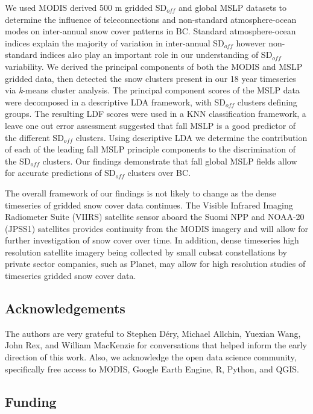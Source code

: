 \documentclass{tATO2e}
\newcommand{\sdoff}{SD$_{off}$}
\begin{document}
We used MODIS derived 500 m gridded \sdoff{} and global MSLP datasets to determine the influence of teleconnections and non-standard atmosphere-ocean modes on inter-annual snow cover patterns in BC. Standard atmosphere-ocean indices explain the majority of variation in inter-annual \sdoff{} however non-standard indices also play an important role in our understanding of \sdoff{} variability. We derived the principal components of both the MODIS and MSLP gridded data, then detected the snow clusters present in our 18 year timeseries via \textit{k}-means cluster analysis. The principal component scores of the MSLP data were decomposed in a descriptive LDA framework, with \sdoff{} clusters defining groups. The resulting LDF scores were used in a  KNN classification framework, a leave one out error assessment suggested that fall MSLP is a good predictor of the different \sdoff{} clusters. Using descriptive LDA we determine the contribution of each of the leading fall MSLP principle components to the discrimination of the \sdoff{} clusters. Our findings demonstrate that fall global MSLP fields allow for accurate predictions of \sdoff{} clusters over BC.
\par
The overall framework of our findings is not likely to change as the dense timeseries of gridded snow cover data continues. The Visible Infrared Imaging Radiometer Suite (VIIRS) satellite sensor aboard the Suomi NPP and NOAA-20 (JPSS1) satellites provides continuity from the MODIS imagery and will allow for further investigation of snow cover over time. In addition, dense timeseries high resolution satellite imagery being collected by small cubsat constellations by private sector companies, such as Planet, may allow for high resolution studies of timeseries gridded snow cover data. 


\subsection{Acknowledgements}

The authors are very grateful to Stephen Déry, Michael Allchin, Yuexian Wang, John Rex, and William MacKenzie for conversations that helped inform the early direction of this work. Also, we acknowledge the open data science community, specifically free access to MODIS, Google Earth Engine, R, Python, and QGIS. 

\subsection{Funding}
\end{document}
